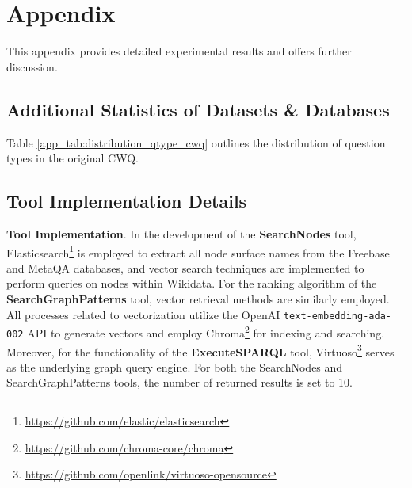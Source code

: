 \section{Appendix}

This appendix provides detailed experimental results and offers further discussion.

\subsection{Additional Statistics of Datasets \& Databases}

\begin{table}[ht]
\centering
{}
\caption{Distribution (Dist.) of question types in the original CWQ.}
\label{app_tab:distribution_qtype_cwq}
\end{table}

Table \ref{app_tab:distribution_qtype_cwq} outlines the distribution of question types in the original CWQ.


\subsection{Tool Implementation Details}
\label{app_sec:tool_imp_details}

\textbf{Tool Implementation}.
In the development of the \textbf{SearchNodes} tool, Elasticsearch\footnote{\url{https://github.com/elastic/elasticsearch}} is employed to extract all node surface names from the Freebase and MetaQA databases, and vector search techniques are implemented to perform queries on nodes within Wikidata. 
For the ranking algorithm of the \textbf{SearchGraphPatterns} tool, vector retrieval methods are similarly employed. All processes related to vectorization utilize the OpenAI \texttt{text-embedding-ada-002} API to generate vectors and employ Chroma\footnote{\url{https://github.com/chroma-core/chroma}} for indexing and searching.
Moreover, for the functionality of the \textbf{ExecuteSPARQL} tool, Virtuoso\footnote{\url{https://github.com/openlink/virtuoso-opensource}} serves as the underlying graph query engine.
For both the SearchNodes and SearchGraphPatterns tools, the number of returned results is set to 10. 

